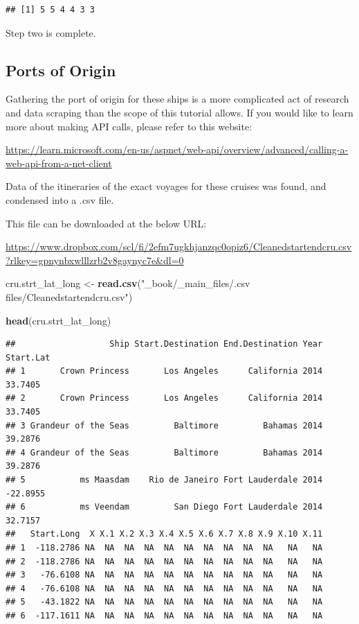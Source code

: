 \documentclass[
  11,
]{book}
\newenvironment{Shaded}{\begin{snugshade}}{\end{snugshade}}
\newcommand{\FunctionTok}[1]{\textcolor[rgb]{0.27,0.27,0.27}{\textbf{#1}}}
\newcommand{\NormalTok}[1]{#1}
\newcommand{\OtherTok}[1]{\textcolor[rgb]{0.37,0.37,0.37}{#1}}
\newcommand{\StringTok}[1]{\textcolor[rgb]{0.5,0.5,0.5}{#1}}
\begin{document}
\begin{verbatim}
## [1] 5 5 4 4 3 3
\end{verbatim}

Step two is complete.

\hypertarget{ports-of-origin}{%
\subsection*{Ports of Origin}\label{ports-of-origin}}


Gathering the port of origin for these ships is a more complicated act of research and data scraping than the scope of this tutorial allows. If you would like to learn more about making API calls, please refer to this website:

\url{https://learn.microsoft.com/en-us/aspnet/web-api/overview/advanced/calling-a-web-api-from-a-net-client}

Data of the itineraries of the exact voyages for these cruises was found, and condensed into a .csv file.

This file can be downloaded at the below URL:

\url{https://www.dropbox.com/scl/fi/2efm7ugkhjanzqc0opiz6/Cleanedstartendcru.csv?rlkey=gpnynbxwlllzrb2v8gaynyc7e\&dl=0}

\begin{Shaded}
\begin{Highlighting}[]
\NormalTok{cru.strt\_lat\_long }\OtherTok{\textless{}{-}} \FunctionTok{read.csv}\NormalTok{(}\StringTok{"\_book/\_main\_files/.csv files/Cleanedstartendcru.csv"}\NormalTok{)}

\FunctionTok{head}\NormalTok{(cru.strt\_lat\_long)}
\end{Highlighting}
\end{Shaded}

\begin{verbatim}
##                   Ship Start.Destination End.Destination Year Start.Lat
## 1       Crown Princess       Los Angeles      California 2014   33.7405
## 2       Crown Princess       Los Angeles      California 2014   33.7405
## 3 Grandeur of the Seas         Baltimore         Bahamas 2014   39.2876
## 4 Grandeur of the Seas         Baltimore         Bahamas 2014   39.2876
## 5           ms Maasdam    Rio de Janeiro Fort Lauderdale 2014  -22.8955
## 6           ms Veendam         San Diego Fort Lauderdale 2014   32.7157
##   Start.Long  X X.1 X.2 X.3 X.4 X.5 X.6 X.7 X.8 X.9 X.10 X.11
## 1  -118.2786 NA  NA  NA  NA  NA  NA  NA  NA  NA  NA   NA   NA
## 2  -118.2786 NA  NA  NA  NA  NA  NA  NA  NA  NA  NA   NA   NA
## 3   -76.6108 NA  NA  NA  NA  NA  NA  NA  NA  NA  NA   NA   NA
## 4   -76.6108 NA  NA  NA  NA  NA  NA  NA  NA  NA  NA   NA   NA
## 5   -43.1822 NA  NA  NA  NA  NA  NA  NA  NA  NA  NA   NA   NA
## 6  -117.1611 NA  NA  NA  NA  NA  NA  NA  NA  NA  NA   NA   NA
\end{verbatim}
\end{document}
